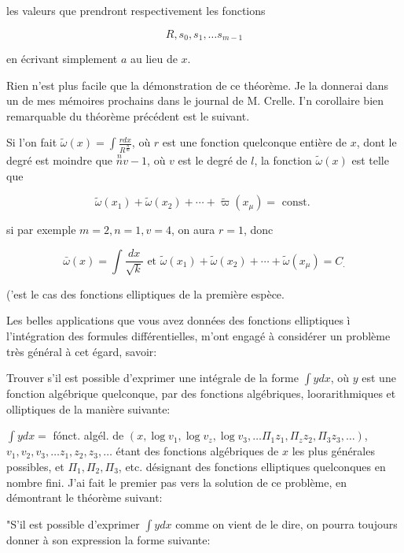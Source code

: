 \documentclass{article}
\begin{document}
les valeurs que prendront respectivement les fonctions

\[
R, s_{0}, s_{1}, \ldots s_{m-1}
\]

en écrivant simplement \(a\) au lieu de \(x\).

Rien n'est plus facile que la démonstration de ce théorème. Je la donnerai dans un de mes mémoires prochains dans le journal de M. Crelle. I'n corollaire bien remarquable du théorème précédent est le suivant.

Si l'on fait \(\widetilde{\omega}(x)=\int \frac{r d x}{R^{\frac{n}{m}}}\), où \(r\) est une fonction quelconque entière de \(x\), dont le degré est moindre que \(\stackrel{n}{n} v-1\), où \(v\) est le degré de \(l\), la fonction \(\widetilde{\omega}(x)\) est telle que

\[
\widetilde{\omega}\left(x_{1}\right)+\widetilde{\omega}\left(x_{2}\right)+\cdots+\widetilde{\varpi}\left(x_{\mu}\right)=\text { const. }
\]

si par exemple \(m=2, n=1, v=4\), on aura \(r=1\), donc

\[
\bar{\omega}(x)=\int \frac{d x}{\sqrt{k}} \text { et } \widetilde{\omega}\left(x_{1}\right)+\widetilde{\omega}\left(x_{2}\right)+\cdots+\widetilde{\omega}\left(x_{\mu}\right)=C_{.}
\]

('est le cas des fonctions elliptiques de la première espèce.

Les belles applications que vous avez données des fonctions elliptiques ì l'intégration des formules différentielles, m'ont engagé à considérer un problème très général à cet égard, savoir:

Trouver s'il est possible d'exprimer une intégrale de la forme \(\int y d x\), où \(y\) est une fonction algébrique quelconque, par des fonctions algébriques, loorarithmiques et olliptiques de la manière suivante:

\(\int y d x=\) fónct. algél. de \(\left(x, \log v_{1}, \log v_{z}, \log v_{3}, \ldots \Pi_{1} z_{1}, \Pi_{z} z_{2}, \Pi_{3} z_{3}, \ldots\right)\),
\(v_{1}, v_{2}, v_{3}, \ldots z_{1}, z_{2}, z_{3}, \ldots\) étant des fonctions algébriques de \(x\) les plus générales possibles, et \(\Pi_{1}, \Pi_{2}, \Pi_{3}\), etc. désignant des fonctions elliptiques quelconques en nombre fini. J'ai fait le premier pas vers la solution de ce problème, en démontrant le théorème suivant:

"S'il est possible d'exprimer \(\int y d x\) comme on vient de le dire, on pourra toujours donner à son expression la forme suivante:
\end{document}
